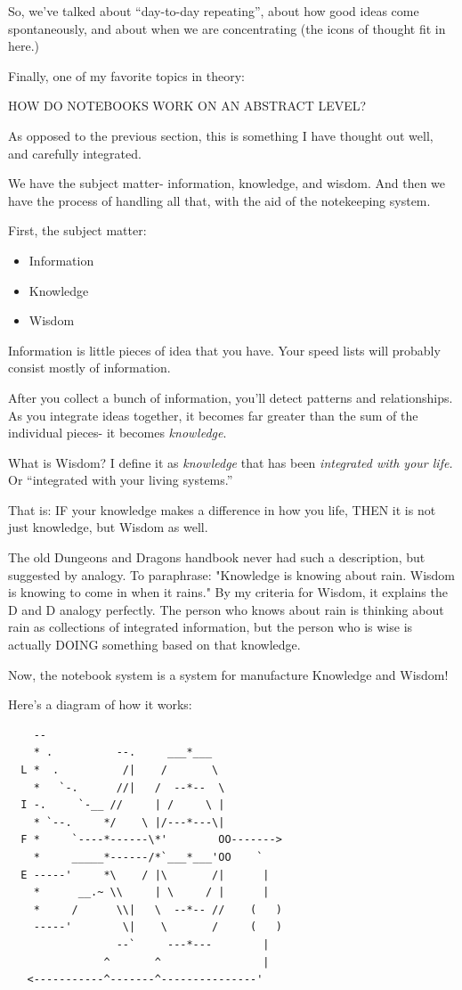 \documentclass[oneside]{book}
\begin{document}
So, we've talked about ``day-to-day repeating'', about how good ideas
come spontaneously, and about when we are concentrating (the icons of
thought fit in here.)

Finally, one of my favorite topics in theory:

HOW DO NOTEBOOKS WORK ON AN ABSTRACT LEVEL?

As opposed to the previous section, this is something I have thought
out well, and carefully integrated.

We have the subject matter- information, knowledge, and wisdom.
And then we have the process of handling all that, with the aid of the
notekeeping system.

First, the subject matter:
\begin{itemize}
\item Information
\item Knowledge
\item Wisdom
\end{itemize}

Information is little pieces of idea that you have. Your speed lists
will probably consist mostly of information.

After you collect a bunch of information, you'll detect patterns and
relationships. As you integrate ideas together, it becomes far greater
than the sum of the individual pieces- it becomes \emph{knowledge}.

What is Wisdom? I define it as \emph{knowledge} that has been \emph{integrated
with your life.} Or ``integrated with your living systems.''

That is: IF your knowledge makes a difference in how you life, THEN it
is not just knowledge, but Wisdom as well.

The old Dungeons and Dragons handbook never had such a description, but
suggested by analogy. To paraphrase: "Knowledge is knowing about
rain. Wisdom is knowing to come in when it rains." By my criteria for
Wisdom, it explains the D and D analogy perfectly. The person who knows
about rain is thinking about rain as collections of integrated
information, but the person who is wise is actually DOING something
based on that knowledge.

Now, the notebook system is a system for manufacture Knowledge and
Wisdom!

Here's a diagram of how it works:

\begin{verbatim}
    --
    * .          --.     ___*___
  L *  .          /|    /       \
    *   `-.      //|   /  --*--  \
  I -.     `-__ //     | /     \ |
    * `--.     */    \ |/---*---\|
  F *     `----*------\*'        OO------->
    *     _____*------/*`___*___'OO    `
  E -----'     *\    / |\       /|      |
    *      __.~ \\     | \     / |      |
    *     /      \\|   \  --*-- //    (   )
    -----'        \|    \       /     (   )
                 --`     ---*---        |
               ^       ^                |
   <-----------^-------^---------------'
\end{verbatim}
\end{document}
